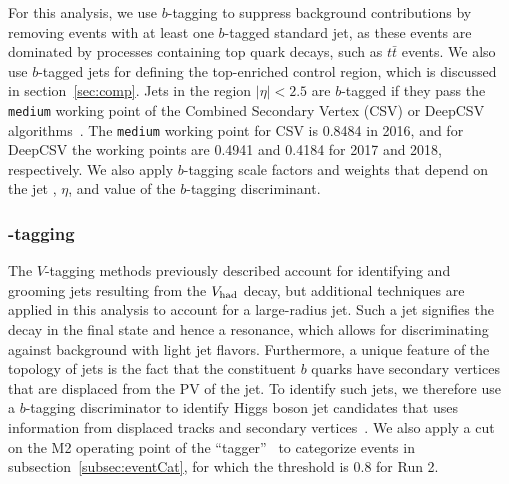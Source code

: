For this analysis, we use $b$-tagging to suppress background contributions by removing events with at least one $b$-tagged standard jet, as these events are dominated by processes containing top quark decays, such as $t\bar{t}$ events.
We also use $b$-tagged jets for defining the top-enriched control region, which is discussed in section~\ref{sec:comp}.
Jets in the region $|\eta|<2.5$ are $b$-tagged if they pass the \texttt{medium} working point of the Combined Secondary Vertex (CSV) or DeepCSV algorithms~\cite{Sirunyan_jet}.
The \texttt{medium} working point for CSV is 0.8484 in 2016, and for DeepCSV the working points are 0.4941 and 0.4184 for 2017 and 2018, respectively.
We also apply $b$-tagging scale factors and weights that depend on the jet \pt, $\eta$, and value of the $b$-tagging discriminant.

\subsubsection{\bbbar-tagging}

The $V$-tagging methods previously described account for identifying and grooming jets resulting from the $V_\mathrm{had}$ decay, but additional techniques are applied in this analysis to account for a large-radius \bbbar jet.
Such a jet signifies the decay \Htobbbar in the final state and hence a \WH resonance, which allows for discriminating against background with light jet flavors.
Furthermore, a unique feature of the topology of \bbbar jets is the fact that the constituent $b$ quarks have secondary vertices that are displaced from the PV of the jet.
To identify such \bbbar jets, we therefore use a $b$-tagging discriminator to identify Higgs boson jet candidates that uses information from displaced tracks and secondary vertices~\cite{CMS-PAS-BTV-15-002}.
We also apply a cut on the M2 operating point of the ``\DoubleB tagger''~\cite{Sirunyan_jet} to categorize events in subsection~\ref{subsec:eventCat}, for which the threshold is 0.8 for Run 2.

